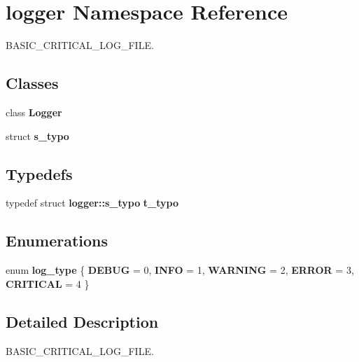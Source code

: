 \section{logger Namespace Reference}
\label{namespacelogger}


B\+A\+S\+I\+C\+\_\+\+C\+R\+I\+T\+I\+C\+A\+L\+\_\+\+L\+O\+G\+\_\+\+F\+I\+LE.  


\subsection*{Classes}
\begin{DoxyCompactItemize}
\item 
class \textbf{ Logger}
\item 
struct \textbf{ s\+\_\+typo}
\end{DoxyCompactItemize}
\subsection*{Typedefs}
\begin{DoxyCompactItemize}
\item 
\mbox{\label{namespacelogger_a64d46b986c760191eb26eef4fc4c26d5}} 
typedef struct \textbf{ logger\+::s\+\_\+typo} {\bfseries t\+\_\+typo}
\end{DoxyCompactItemize}
\subsection*{Enumerations}
\begin{DoxyCompactItemize}
\item 
\mbox{\label{namespacelogger_ae1c0c15733b1d5c33bffa9e7b81d4e73}} 
enum {\bfseries log\+\_\+type} \{ \newline
{\bfseries D\+E\+B\+UG} = 0, 
{\bfseries I\+N\+FO} = 1, 
{\bfseries W\+A\+R\+N\+I\+NG} = 2, 
{\bfseries E\+R\+R\+OR} = 3, 
\newline
{\bfseries C\+R\+I\+T\+I\+C\+AL} = 4
 \}
\end{DoxyCompactItemize}


\subsection{Detailed Description}
B\+A\+S\+I\+C\+\_\+\+C\+R\+I\+T\+I\+C\+A\+L\+\_\+\+L\+O\+G\+\_\+\+F\+I\+LE. 

